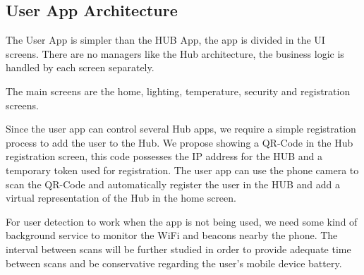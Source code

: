 \subsection{User App Architecture}
The User App is simpler than the HUB App, the app is divided in the \ac{UI} screens. There are no managers like the Hub architecture, the business logic is handled by each screen separately. 


The main screens are the home, lighting, temperature, security and registration screens.

Since the user app can control several Hub apps, we require a simple registration process to add the user to the Hub. We propose showing a QR-Code in the Hub registration screen, this code possesses the \ac{IP address} for the HUB and a temporary token used for registration. The user app can use the phone camera to scan the QR-Code and automatically register the user in the HUB and add a virtual representation of the Hub in the home screen.

For user detection to work when the app is not being used, we need some kind of background service to monitor the \ac{WiFi} and beacons nearby the phone. The interval between scans will be further studied in order to provide adequate time between scans and be conservative regarding the user's mobile device battery.



